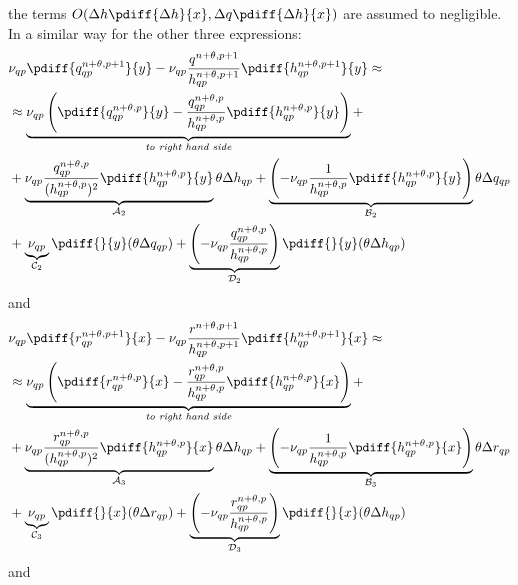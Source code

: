 the terms $O(\Delta h\pdiff{\Delta h}{x}, \Delta q \pdiff{\Delta h}{x})$ are assumed to negligible.
In a similar way for the other three expressions:
\begin{align}
    & \nu_{qp} \pdiff{q^{n+\theta, p+1}_{qp}}{y}  -
\nu_{qp} \frac{q^{n+\theta, p+1}}{h^{n+\theta, p+1}_{qp}}\pdiff{ h^{n+\theta, p+1}_{qp}}{y} \approx
\\
    & \approx
\underbrace{\nu_{qp} \left( \pdiff{q^{n+\theta,p}_{qp}}{y} - \frac{q^{n+\theta,p}_{qp}}{h^{n+\theta,p}_{qp}} \pdiff{h^{n+\theta,p}_{qp}}{y} \right)}_{\textit {to right hand side}} +
%
\\*
& + \underbrace{\nu_{qp}  \frac{q^{n+\theta,p}_{qp}}{(h^{n+\theta,p}_{qp})^2} \pdiff{h^{n+\theta,p}_{qp}}{y}}_{{\cal{A}}_2} \theta \Delta h_{qp}
+ \underbrace{\left(- \nu_{qp} \frac{1}{h^{n+\theta,p}_{qp}}  \pdiff{h^{n+\theta,p}_{qp}}{y}\right)}_{{\cal{B}}_2} \theta \Delta q_{qp}
\\*
& +
\underbrace{\nu_{qp}}_{{\cal{C}}_2} \pdiff{}{y}(\theta \Delta q_{qp}) +
\underbrace{\left(-\nu_{qp} \frac{q^{n+\theta,p}_{qp}}{h^{n+\theta,p}_{qp}} \right)}_{{\cal{D}}_2} \pdiff{}{y}(\theta \Delta h_{qp})
\end{align}
and
\begin{align}
    & \nu_{qp} \pdiff{r^{n+\theta, p+1}_{qp}}{x}  -
\nu_{qp} \frac{r^{n+\theta, p+1}}{h^{n+\theta, p+1}_{qp}}\pdiff{ h^{n+\theta, p+1}_{qp}}{x} \approx
\\
    & \approx
\underbrace{\nu_{qp} \left( \pdiff{r^{n+\theta,p}_{qp}}{x} - \frac{r^{n+\theta,p}_{qp}}{h^{n+\theta,p}_{qp}} \pdiff{h^{n+\theta,p}_{qp}}{x} \right)}_{\textit {to right hand side}} +
%
\\*
& + \underbrace{\nu_{qp}  \frac{r^{n+\theta,p}_{qp}}{(h^{n+\theta,p}_{qp})^2} \pdiff{h^{n+\theta,p}_{qp}}{x}}_{{\cal{A}}_3} \theta \Delta h_{qp}
+ \underbrace{\left(- \nu_{qp} \frac{1}{h^{n+\theta,p}_{qp}}  \pdiff{h^{n+\theta,p}_{qp}}{x}\right)}_{{\cal{B}}_3} \theta \Delta r_{qp}
\\*
& +
\underbrace{\nu_{qp}}_{{\cal{C}}_3} \pdiff{}{x}(\theta \Delta r_{qp}) +
\underbrace{\left( -\nu_{qp} \frac{r^{n+\theta,p}_{qp}}{h^{n+\theta,p}_{qp}} \right)}_{{\cal{D}}_3} \pdiff{}{x}(\theta \Delta h_{qp})
\end{align}
and
